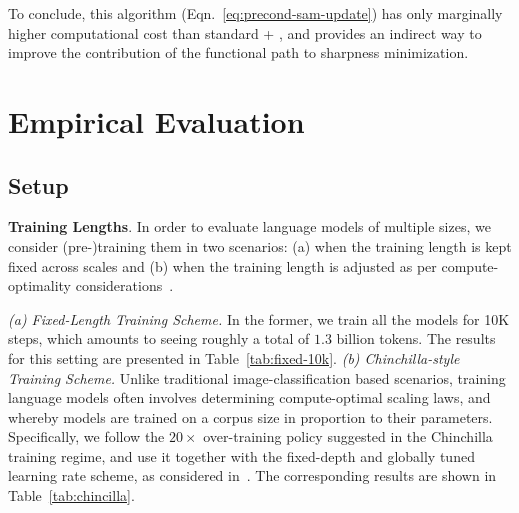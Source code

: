 To conclude, this algorithm (Eqn.~\ref{eq:precond-sam-update}) has only marginally higher computational cost than standard \SAM + \adamw, 
and provides an indirect way to improve the contribution of the
functional path to sharpness minimization.























\section{Empirical Evaluation}\label{sec:empirics} 
\subsection{Setup}
\textbf{Training Lengths}. In order to evaluate language models of multiple sizes, we consider (pre-)training them in two scenarios: (a) when the training length is kept fixed across scales and (b) when the training length is adjusted as per compute-optimality considerations~\citep{kaplan2020scalinglawsneurallanguage,hoffmann2022trainingcomputeoptimallargelanguage}. 

\textit{(a) Fixed-Length Training Scheme.} 
In the former, we train all the models for 10K steps, which amounts to seeing roughly a total of $1.3$ billion tokens. The results for this setting are presented in Table~\ref{tab:fixed-10k}. \textit{(b) Chinchilla-style Training Scheme.}
Unlike traditional image-classification based scenarios,  training language models often involves determining compute-optimal scaling laws, and whereby models are trained on a corpus size in proportion to their parameters. Specifically, we follow the $20\times$ over-training policy suggested in the Chinchilla~\citep{hoffmann2022trainingcomputeoptimallargelanguage} training regime, and use it together with the fixed-depth and globally tuned learning rate scheme, as considered in~\citet{everett2024scaling}. The corresponding results are shown in Table~\ref{tab:chincilla}.

